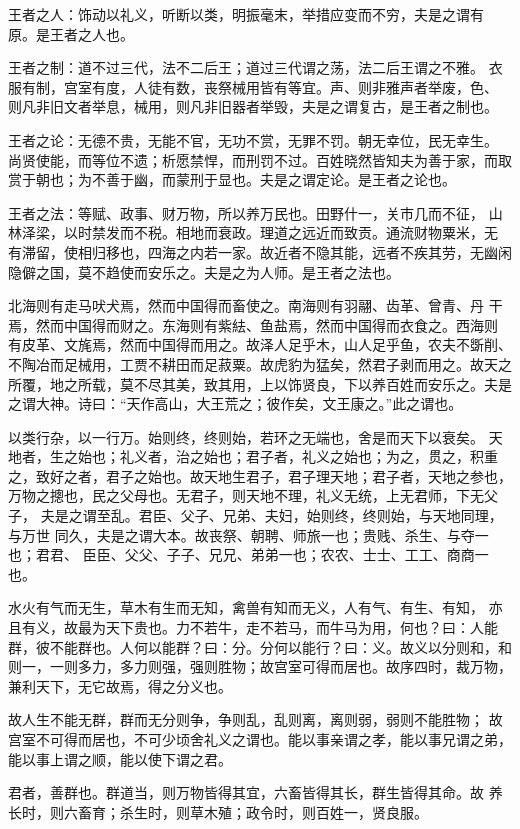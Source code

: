 \documentclass[]{article}
\begin{document}
王者之人：饰动以礼义，听断以类，明振毫末，举措应变而不穷，夫是之谓有
原。是王者之人也。

王者之制：道不过三代，法不二后王；道过三代谓之荡，法二后王谓之不雅。
衣服有制，宫室有度，人徒有数，丧祭械用皆有等宜。声、则非雅声者举废，色、
则凡非旧文者举息，械用，则凡非旧器者举毁，夫是之谓复古，是王者之制也。

王者之论：无德不贵，无能不官，无功不赏，无罪不罚。朝无幸位，民无幸生。
尚贤使能，而等位不遗；析愿禁悍，而刑罚不过。百姓晓然皆知夫为善于家，而取
赏于朝也；为不善于幽，而蒙刑于显也。夫是之谓定论。是王者之论也。

王者之法：等赋、政事、财万物，所以养万民也。田野什一，关市几而不征，
山林泽梁，以时禁发而不税。相地而衰政。理道之远近而致贡。通流财物粟米，无
有滞留，使相归移也，四海之内若一家。故近者不隐其能，远者不疾其劳，无幽闲
隐僻之国，莫不趋使而安乐之。夫是之为人师。是王者之法也。

北海则有走马吠犬焉，然而中国得而畜使之。南海则有羽翮、齿革、曾青、丹
干焉，然而中国得而财之。东海则有紫紶、鱼盐焉，然而中国得而衣食之。西海则
有皮革、文旄焉，然而中国得而用之。故泽人足乎木，山人足乎鱼，农夫不斲削、
不陶冶而足械用，工贾不耕田而足菽粟。故虎豹为猛矣，然君子剥而用之。故天之
所覆，地之所载，莫不尽其美，致其用，上以饰贤良，下以养百姓而安乐之。夫是
之谓大神。诗曰：``天作高山，大王荒之；彼作矣，文王康之。''此之谓也。

以类行杂，以一行万。始则终，终则始，若环之无端也，舍是而天下以衰矣。
天地者，生之始也；礼义者，治之始也；君子者，礼义之始也；为之，贯之，积重
之，致好之者，君子之始也。故天地生君子，君子理天地；君子者，天地之参也，
万物之摠也，民之父母也。无君子，则天地不理，礼义无统，上无君师，下无父子，
夫是之谓至乱。君臣、父子、兄弟、夫妇，始则终，终则始，与天地同理，与万世
同久，夫是之谓大本。故丧祭、朝聘、师旅一也；贵贱、杀生、与夺一也；君君、
臣臣、父父、子子、兄兄、弟弟一也；农农、士士、工工、商商一也。

水火有气而无生，草木有生而无知，禽兽有知而无义，人有气、有生、有知，
亦且有义，故最为天下贵也。力不若牛，走不若马，而牛马为用，何也？曰：人能
群，彼不能群也。人何以能群？曰：分。分何以能行？曰：义。故义以分则和，和
则一，一则多力，多力则强，强则胜物；故宫室可得而居也。故序四时，裁万物，
兼利天下，无它故焉，得之分义也。

故人生不能无群，群而无分则争，争则乱，乱则离，离则弱，弱则不能胜物；
故宫室不可得而居也，不可少顷舍礼义之谓也。能以事亲谓之孝，能以事兄谓之弟，
能以事上谓之顺，能以使下谓之君。

君者，善群也。群道当，则万物皆得其宜，六畜皆得其长，群生皆得其命。故
养长时，则六畜育；杀生时，则草木殖；政令时，则百姓一，贤良服。
\end{document}
